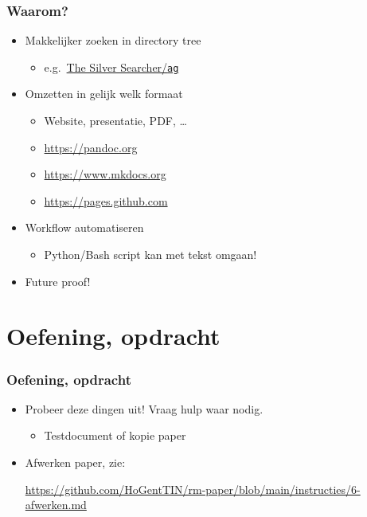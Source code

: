 \documentclass[aspectratio=169]{beamer}
\begin{document}
\begin{frame}
  \frametitle{Waarom?}

  \begin{itemize}
    \item Makkelijker zoeken in directory tree
    \begin{itemize}
      \item e.g.~\href{https://github.com/ggreer/the_silver_searcher}{The Silver Searcher/\texttt{ag}}
    \end{itemize}
    \item Omzetten in gelijk welk formaat
      \begin{itemize}
        \item Website, presentatie, PDF, \ldots
        \item \url{https://pandoc.org}
        \item \url{https://www.mkdocs.org}
        \item \url{https://pages.github.com}
      \end{itemize}
    \item Workflow automatiseren
    \begin{itemize}
      \item Python/Bash script kan met tekst omgaan!
    \end{itemize}
    \item Future proof!
  \end{itemize}

\end{frame}

\section{Oefening, opdracht}

\begin{frame}
  \frametitle{Oefening, opdracht}

  \begin{itemize}
    \item Probeer deze dingen uit! Vraag hulp waar nodig.
    \begin{itemize}
      \item Testdocument of kopie paper
    \end{itemize}
    \item Afwerken paper, zie:
    
    \url{https://github.com/HoGentTIN/rm-paper/blob/main/instructies/6-afwerken.md}
  \end{itemize}
\end{frame}
\end{document}
